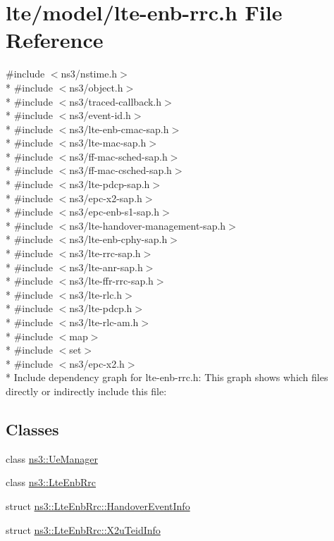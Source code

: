 \hypertarget{lte-enb-rrc_8h}{}\section{lte/model/lte-\/enb-\/rrc.h File Reference}
\label{lte-enb-rrc_8h}
{\ttfamily \#include $<$ns3/nstime.\+h$>$}\\*
{\ttfamily \#include $<$ns3/object.\+h$>$}\\*
{\ttfamily \#include $<$ns3/traced-\/callback.\+h$>$}\\*
{\ttfamily \#include $<$ns3/event-\/id.\+h$>$}\\*
{\ttfamily \#include $<$ns3/lte-\/enb-\/cmac-\/sap.\+h$>$}\\*
{\ttfamily \#include $<$ns3/lte-\/mac-\/sap.\+h$>$}\\*
{\ttfamily \#include $<$ns3/ff-\/mac-\/sched-\/sap.\+h$>$}\\*
{\ttfamily \#include $<$ns3/ff-\/mac-\/csched-\/sap.\+h$>$}\\*
{\ttfamily \#include $<$ns3/lte-\/pdcp-\/sap.\+h$>$}\\*
{\ttfamily \#include $<$ns3/epc-\/x2-\/sap.\+h$>$}\\*
{\ttfamily \#include $<$ns3/epc-\/enb-\/s1-\/sap.\+h$>$}\\*
{\ttfamily \#include $<$ns3/lte-\/handover-\/management-\/sap.\+h$>$}\\*
{\ttfamily \#include $<$ns3/lte-\/enb-\/cphy-\/sap.\+h$>$}\\*
{\ttfamily \#include $<$ns3/lte-\/rrc-\/sap.\+h$>$}\\*
{\ttfamily \#include $<$ns3/lte-\/anr-\/sap.\+h$>$}\\*
{\ttfamily \#include $<$ns3/lte-\/ffr-\/rrc-\/sap.\+h$>$}\\*
{\ttfamily \#include $<$ns3/lte-\/rlc.\+h$>$}\\*
{\ttfamily \#include $<$ns3/lte-\/pdcp.\+h$>$}\\*
{\ttfamily \#include $<$ns3/lte-\/rlc-\/am.\+h$>$}\\*
{\ttfamily \#include $<$map$>$}\\*
{\ttfamily \#include $<$set$>$}\\*
{\ttfamily \#include $<$ns3/epc-\/x2.\+h$>$}\\*
Include dependency graph for lte-\/enb-\/rrc.h\+:
This graph shows which files directly or indirectly include this file\+:
\subsection*{Classes}
\begin{DoxyCompactItemize}
\item 
class \hyperlink{classns3_1_1UeManager}{ns3\+::\+Ue\+Manager}
\item 
class \hyperlink{classns3_1_1LteEnbRrc}{ns3\+::\+Lte\+Enb\+Rrc}
\item 
struct \hyperlink{structns3_1_1LteEnbRrc_1_1HandoverEventInfo}{ns3\+::\+Lte\+Enb\+Rrc\+::\+Handover\+Event\+Info}
\item 
struct \hyperlink{structns3_1_1LteEnbRrc_1_1X2uTeidInfo}{ns3\+::\+Lte\+Enb\+Rrc\+::\+X2u\+Teid\+Info}
\end{DoxyCompactItemize}
